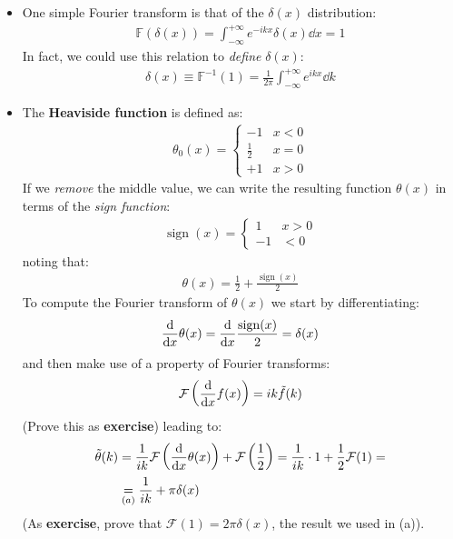 \documentclass[../template.tex]{subfiles}
\begin{document}
\begin{itemize}
    \item One simple Fourier transform is that of the $\delta(x)$ distribution:
    \begin{align*}
        \mathbb{F}(\delta(x)) = \int_{-\infty}^{+\infty}  e^{-ikx} \delta(x) \dd{x} = 1
    \end{align*} 
    In fact, we could use this relation to \textit{define} $\delta(x)$:
    \begin{align*}
        \delta(x) \equiv \mathbb{F}^{-1}(1) = \frac{1}{2\pi} \int_{-\infty}^{+\infty}   e^{ikx} \dd{k}
    \end{align*}  
    \item The \textbf{Heaviside function}  is defined as:
    \begin{align*}
        \theta_0(x) = \begin{cases}
            -1 & x<0\\
            \frac{1}{2} & x=0\\
            +1 & x>0 
        \end{cases}    
    \end{align*}
    If we \textit{remove} the middle value, we can write the resulting function $\theta(x)$  in terms of the \textit{sign function}: 
    \begin{align*}
        \operatorname{sign}(x) = \begin{cases}
            1 & x > 0\\
            -1 & < 0
        \end{cases}
    \end{align*}   
    noting that:
    \begin{align*}
        \theta(x) = \frac{1}{2} + \frac{\operatorname{sign}(x)}{2}  
    \end{align*}
    To compute the Fourier transform of $\theta(x)$ we start by differentiating:
    \begin{align*}
        \dv{x} \theta(x) = \dv{x} \frac{\operatorname{sign}(x)}{2} = \delta(x)  
    \end{align*} 
    and then make use of a property of Fourier transforms:
    \begin{align*}
        \mathcal{F}\left(\dv{x} f(x)\right) = ik \tilde{f}(k)
    \end{align*}
    (Prove this as \textbf{exercise})
    leading to:
    \begin{align*}
        \tilde{\theta}(k) &= \frac{1}{ik} \mathcal{F}\left(\dv{x} \theta(x)\right) + \mathcal{F}\left(\frac{1}{2} \right) = \frac{1}{ik} \cdot 1 + \frac{1}{2} \mathcal{F}(1) =\\
        &\underset{(a)}{=}    \frac{1}{ik} + \pi \delta(x) 
    \end{align*}
    (As \textbf{exercise}, prove that $\mathcal{F}(1) = 2\pi \delta(x)$, the result we used in (a)).
\end{itemize}
\end{document}
